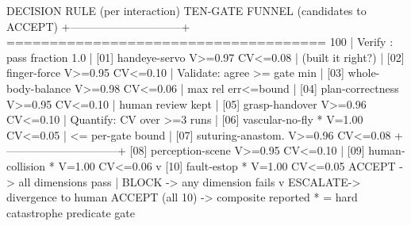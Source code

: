 \begin{asciifig}
DECISION RULE (per interaction)    TEN-GATE FUNNEL (candidates to ACCEPT)
+------------------------------+   ===================================== 100%
| Verify  : pass fraction 1.0  |    [01] handeye-servo      V>=0.97 CV<=0.08
|          (built it right?)   |    [02] finger-force       V>=0.95 CV<=0.10
| Validate: agree >= gate min  |    [03] whole-body-balance V>=0.98 CV<=0.06
|          max rel err<=bound  |    [04] plan-correctness   V>=0.95 CV<=0.10
|          human review kept   |    [05] grasp-handover     V>=0.96 CV<=0.10
| Quantify: CV over >=3 runs   |    [06] vascular-no-fly  * V=1.00  CV<=0.05
|          <= per-gate bound   |    [07] suturing-anastom.  V>=0.96 CV<=0.08
+------------------------------+    [08] perception-scene   V>=0.95 CV<=0.10
             |                      [09] human-collision  * V=1.00  CV<=0.06
             v                      [10] fault-estop      * V=1.00  CV<=0.05
  ACCEPT  -> all dimensions pass                |
  BLOCK   -> any dimension fails                v
  ESCALATE-> divergence to human    ACCEPT (all 10) -> composite reported
                                    * = hard catastrophe predicate gate
\end{asciifig}

